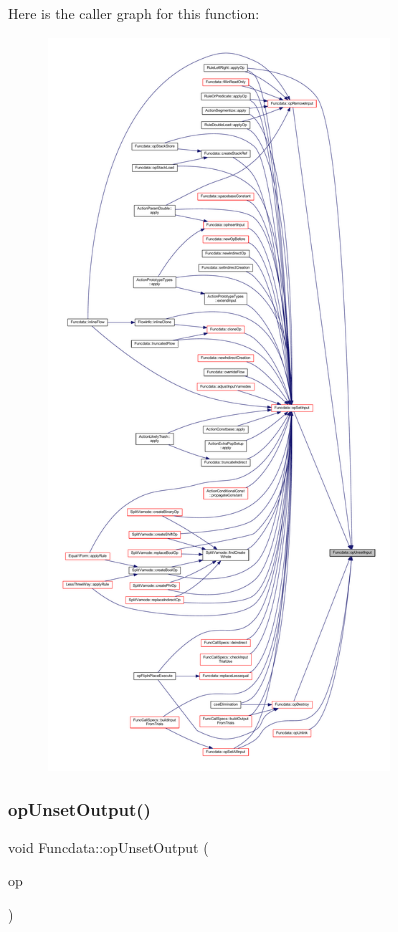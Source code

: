 Here is the caller graph for this function\+:
\nopagebreak
\begin{figure}[H]
\begin{center}
\leavevmode
\includegraphics[height=550pt]{class_funcdata_a16f821f09d862b3c908d2bce7530b90a_icgraph}
\end{center}
\end{figure}
\mbox{\label{class_funcdata_ab91b54da6501e12d4ad1e81ab5d0e5c4}} 
\subsubsection{\texorpdfstring{opUnsetOutput()}{opUnsetOutput()}}
{\footnotesize\ttfamily void Funcdata\+::op\+Unset\+Output (\begin{DoxyParamCaption}\item[{\mbox{\hyperlink{class_pcode_op}{Pcode\+Op}} $\ast$}]{op }\end{DoxyParamCaption})}



